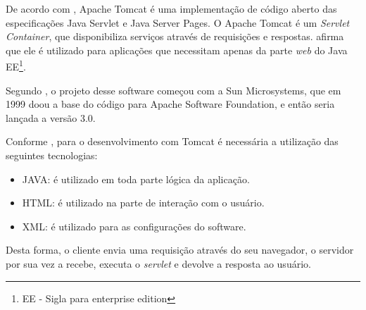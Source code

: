
	\par De acordo com , Apache Tomcat é uma implementação
de código aberto das especificações Java Servlet e Java Server Pages. O Apache
Tomcat é um \textit{Servlet Container}, que disponibiliza serviços através de
requisições e respostas.  afirma que ele é utilizado para
aplicações que necessitam apenas da parte \textit{web} do Java EE\footnote{EE -
Sigla para enterprise edition}.

	\par Segundo , o projeto desse software começou com a
Sun Microsystems, que em 1999 doou a base do código para Apache Software
Foundation, e então seria lançada a versão 3.0.

	\par Conforme , para o desenvolvimento com
Tomcat é necessária a utilização das seguintes tecnologias:
	
	\begin{itemize}
	  
	  \item JAVA: é utilizado em toda parte lógica da aplicação.
	  
	  \item HTML: é utilizado na parte de interação com o usuário.
	  
	  \item XML: é utilizado para as configurações do software. 
	
	\end{itemize}
 
	\par Desta forma, o cliente envia uma requisição através do seu navegador, o
servidor por sua vez a recebe, executa o \textit{servlet} e devolve a resposta
ao usuário.